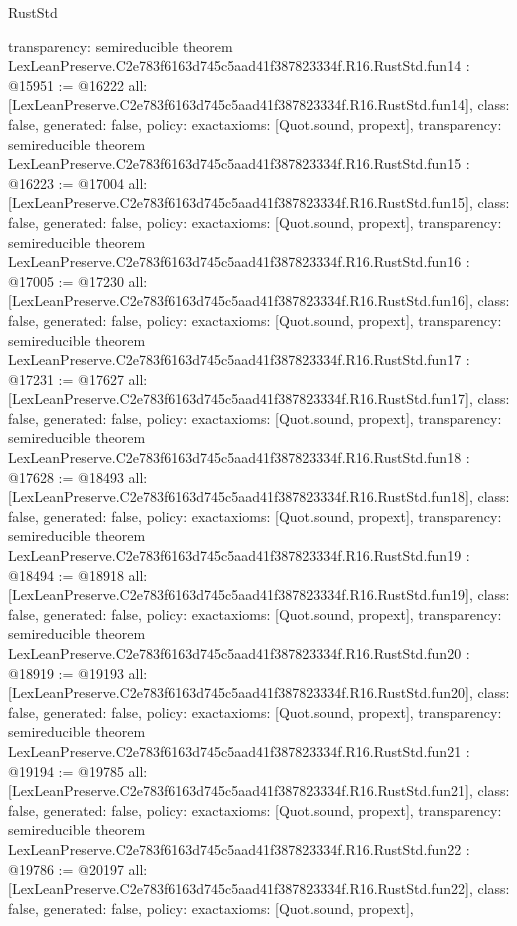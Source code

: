 \begin{lexlean}{RustStd}
\begin{coremodule}
{  transparency: semireducible
}
theorem LexLeanPreserve.C2e783f6163d745c5aad41f387823334f.R16.RustStd.fun14 : @15951 := @16222 {
  all: [LexLeanPreserve.C2e783f6163d745c5aad41f387823334f.R16.RustStd.fun14],
  class: false,
  generated: false,
  policy: exact{axioms: [Quot.sound, propext]},
  transparency: semireducible
}
theorem LexLeanPreserve.C2e783f6163d745c5aad41f387823334f.R16.RustStd.fun15 : @16223 := @17004 {
  all: [LexLeanPreserve.C2e783f6163d745c5aad41f387823334f.R16.RustStd.fun15],
  class: false,
  generated: false,
  policy: exact{axioms: [Quot.sound, propext]},
  transparency: semireducible
}
theorem LexLeanPreserve.C2e783f6163d745c5aad41f387823334f.R16.RustStd.fun16 : @17005 := @17230 {
  all: [LexLeanPreserve.C2e783f6163d745c5aad41f387823334f.R16.RustStd.fun16],
  class: false,
  generated: false,
  policy: exact{axioms: [Quot.sound, propext]},
  transparency: semireducible
}
theorem LexLeanPreserve.C2e783f6163d745c5aad41f387823334f.R16.RustStd.fun17 : @17231 := @17627 {
  all: [LexLeanPreserve.C2e783f6163d745c5aad41f387823334f.R16.RustStd.fun17],
  class: false,
  generated: false,
  policy: exact{axioms: [Quot.sound, propext]},
  transparency: semireducible
}
theorem LexLeanPreserve.C2e783f6163d745c5aad41f387823334f.R16.RustStd.fun18 : @17628 := @18493 {
  all: [LexLeanPreserve.C2e783f6163d745c5aad41f387823334f.R16.RustStd.fun18],
  class: false,
  generated: false,
  policy: exact{axioms: [Quot.sound, propext]},
  transparency: semireducible
}
theorem LexLeanPreserve.C2e783f6163d745c5aad41f387823334f.R16.RustStd.fun19 : @18494 := @18918 {
  all: [LexLeanPreserve.C2e783f6163d745c5aad41f387823334f.R16.RustStd.fun19],
  class: false,
  generated: false,
  policy: exact{axioms: [Quot.sound, propext]},
  transparency: semireducible
}
theorem LexLeanPreserve.C2e783f6163d745c5aad41f387823334f.R16.RustStd.fun20 : @18919 := @19193 {
  all: [LexLeanPreserve.C2e783f6163d745c5aad41f387823334f.R16.RustStd.fun20],
  class: false,
  generated: false,
  policy: exact{axioms: [Quot.sound, propext]},
  transparency: semireducible
}
theorem LexLeanPreserve.C2e783f6163d745c5aad41f387823334f.R16.RustStd.fun21 : @19194 := @19785 {
  all: [LexLeanPreserve.C2e783f6163d745c5aad41f387823334f.R16.RustStd.fun21],
  class: false,
  generated: false,
  policy: exact{axioms: [Quot.sound, propext]},
  transparency: semireducible
}
theorem LexLeanPreserve.C2e783f6163d745c5aad41f387823334f.R16.RustStd.fun22 : @19786 := @20197 {
  all: [LexLeanPreserve.C2e783f6163d745c5aad41f387823334f.R16.RustStd.fun22],
  class: false,
  generated: false,
  policy: exact{axioms: [Quot.sound, propext]},
}
\end{coremodule}
\end{lexlean}
